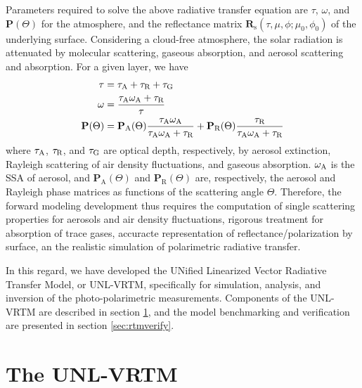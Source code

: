 Parameters required to solve the above radiative transfer equation are $\tau$,
$\omega$, and $\mathbf{P}(\Theta)$ for the atmosphere, and the reflectance
matrix $\mathbf{R}_\text{s}(\tau,\mu,\phi; \mu_0, \phi_0)$ of 
the underlying surface. Considering a cloud-free atmosphere, the solar
radiation is attenuated by molecular scattering, gaseous absorption, and
aerosol scattering and absorption. For a given layer, we have
\begin{align}
\tau   &= \tau_\text{A} + \tau_\text{R} + \tau_\text{G}  \label{eq:opt1} \\
\omega &= \frac{\tau_\text{A}\omega_\text{A} + \tau_\text{R}}{\tau} \label{eq:opt2} \\
\mathbf{P}(\Theta) &=\mathbf{P}_\text{A}(\Theta)
                     \frac{\tau_\text{A}\omega_\text{A}}{\tau_\text{A}\omega_\text{A}+\tau_\text{R}} 
                    + \mathbf{P}_\text{R}(\Theta)
                    \frac{\tau_\text{R}}{\tau_\text{A}\omega_\text{A}+\tau_\text{R}} \label{eq:opt3}
\end{align}
where $\tau_\text{A}$, $\tau_\text{R}$, and $\tau_\text{G}$ are optical depth, respectively, by 
aerosol extinction, Rayleigh scattering of air density fluctuations, 
and gaseous absorption. $\omega_\text{A}$ is the SSA of aerosol,  and
$\mathbf{P}_\text{A}(\Theta)$ and $\mathbf{P}_\text{R}(\Theta)$ are, 
respectively, the aerosol and Rayleigh phase matrices as functions of the 
scattering angle $\Theta$. Therefore, the forward modeling development 
thus requires the computation of single scattering properties for aerosols and
air density fluctuations, rigorous treatment for absorption of trace gases, 
accuracte representation of reflectance/polarization by surface, an the
realistic simulation of polarimetric radiative transfer. 

In this regard, we have developed the UNified Linearized Vector
Radiative Transfer Model, or UNL-VRTM, specifically for simulation,
analysis, and inversion of the photo-polarimetric measurements.
Components of the UNL-VRTM are described in section \ref{sec:unlvrtm},
and the model benchmarking and verification are presented in section
\ref{sec:rtmverify}.

\section{The UNL-VRTM} \label{sec:unlvrtm}

